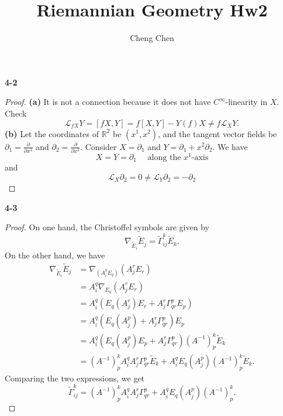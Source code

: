 \documentclass[11pt, a4paper]{article}
\title{Riemannian Geometry Hw2}
\author{Cheng Chen}
\date{}
\theoremstyle{plain}
\theoremstyle{definition}
\theoremstyle{remark}
\newcommand{\Lie}{\mathcal{L}_}
\newcommand{\cR}{\mathbb{R}}
\newcommand{\p}{\partial}
\newcommand{\gm}{\Gamma}
\newcommand{\tgm}{\tilde{\Gamma}}
\newcommand{\tE}{\tilde{E}}
\begin{document}
\maketitle
\noindent\textbf{4-2}
\begin{proof}
    \textbf{(a)} It is not a connection because it does not have $C^\infty$-linearity in $X$. Check
    \[
        \Lie{fX}Y = [fX,Y] = f[X,Y] - Y(f)X \neq f\Lie{X}Y.
    \]
    \textbf{(b)} Let the coordinates of $\cR^2$ be $(x^1,x^2)$, and the tangent vector fields be $\partial_1 = \frac{\p}{\p x^1}$ and $\partial_2 = \frac{\p}{\p x^2}$.
    Consider $X = \p_1$ and $Y = \p_1 + x^2\p_2$. We have
    \[
        X = Y = \p_1\quad\text{ along the $x^1$-axis}
    \]
    and 
    \[
        \Lie{X}\p_2 = 0 \neq \Lie{Y}\p_2 = -\p_2
    \]  
\end{proof}

\newcommand{\eps}{\varepsilon}

\noindent\textbf{4-3}
\begin{proof}
    On one hand, the Christoffel symbols are given by 
    \[ \nabla_{\tE_i}\tE_j = \tgm_{ij}^k\tE_k. \]
    On the other hand, we have
    \begin{align*}
        \nabla_{\tE_i}\tE_j &= \nabla_{(A_i^qE_q)} (A_j^r E_r)\\
        &= A_i^q \nabla_{E_q}(A_j^r E_r)\\
        &= A_i^q \left( E_q(A_j^r)E_r + A_j^r \gm_{qr}^p E_p \right)\\
        &= A_i^q \left( E_q(A_j^p) + A_j^r \gm_{qr}^p  \right)E_p\\
        &= A_i^q \left( E_q(A_j^p)E_p + A_j^r \gm_{qr}^p  \right)(A^{-1})^k_p \tE_k\\
        &= (A^{-1})_p^k A_i^qA_j^r \gm_{qr}^p \tE_k + A_i^q E_q(A_j^p)(A^{-1})_p^k \tE_k.
    \end{align*}
    Comparing the two expressions, we get
    \[ \tgm_{ij}^k = (A^{-1})_p^k A_i^qA_j^r \gm_{qr}^p + A_i^q E_q(A_j^p)(A^{-1})_p^k. \]
\end{proof}
\end{document}

